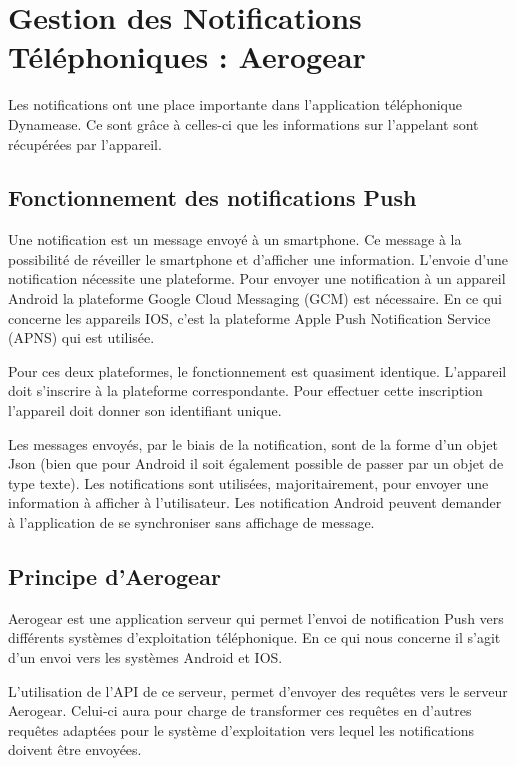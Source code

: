 \section{Gestion des Notifications Téléphoniques : Aerogear}

Les notifications ont une place importante dans l'application téléphonique Dynamease. Ce sont grâce à celles-ci que les informations sur l'appelant sont récupérées par l'appareil. 

\subsection{Fonctionnement des notifications Push}

Une notification est un message envoyé à un smartphone. Ce message à la possibilité de réveiller le smartphone et d'afficher une information. L'envoie d'une notification nécessite une plateforme. Pour envoyer une notification à un appareil Android la plateforme  Google Cloud Messaging (GCM) est nécessaire. En ce qui concerne les appareils IOS, c'est la plateforme Apple Push Notification Service (APNS) qui est utilisée.

Pour ces deux plateformes, le fonctionnement est quasiment identique. L'appareil doit s'inscrire à la plateforme correspondante. Pour effectuer cette inscription l'appareil doit donner son identifiant unique.

Les messages envoyés, par le biais de la notification, sont de la forme d'un objet Json (bien que pour Android il soit également possible de passer par un objet de type texte). Les notifications sont utilisées, majoritairement, pour envoyer une information à afficher à l'utilisateur. Les notification Android peuvent demander à l'application de se synchroniser sans affichage de message.

\subsection{Principe d'Aerogear}

Aerogear est une application serveur qui permet l'envoi de notification Push vers différents systèmes d'exploitation téléphonique. En ce qui nous concerne il s'agit d'un envoi vers les systèmes Android et IOS.

L'utilisation de l'API de ce serveur, permet d'envoyer des requêtes vers le serveur Aerogear. Celui-ci aura pour charge de transformer ces requêtes en d'autres requêtes adaptées pour le système d'exploitation vers lequel les notifications doivent être envoyées.

